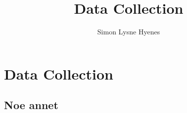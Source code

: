 \documentclass[../MasterThesis.tex]{subfiles}
\author{Simon Lysne Hyenes}
\title{Data Collection}
\begin{document}
\section{Data Collection}




\subsection{Noe annet}
\end{document}
